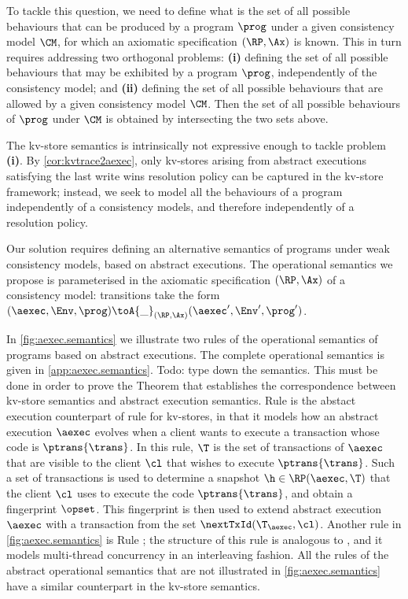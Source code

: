 To tackle this question, we need to define what is the set of all possible behaviours 
that can be produced by a program $\prog$ under a given consistency model $\CM$, for 
which an axiomatic specification $(\RP, \Ax)$ is known. This in turn requires addressing two orthogonal 
problems: \textbf{(i)} defining the set of all possible behaviours that may be exhibited by a program 
$\prog$, independently of the consistency model; and \textbf{(ii)} defining the set of all possible 
behaviours that are allowed by a given consistency model $\CM$. Then the set of all 
possible behaviours of $\prog$ under $\CM$ is obtained by intersecting the two sets 
above.

The kv-store semantics is intrinsically not expressive enough to tackle problem \textbf{(i)}. 
By \cref{cor:kvtrace2aexec}, only kv-stores arising 
from abstract executions satisfying the last write wins resolution policy can be captured in the kv-store 
framework; instead, we seek to model all the behaviours of a program independently of a consistency 
models, and therefore independently of a resolution policy. 

Our solution requires defining an alternative semantics of programs under weak consistency models, 
based on abstract executions. The operational semantics we propose is parameterised in 
the axiomatic specification $(\RP, \Ax)$ of a consistency model: transitions take the form 
$(\aexec, \Env, \prog) \toA{\_}_{(\RP, \Ax)} (\aexec', \Env', \prog')$. 

In \cref{fig:aexec.semantics} we illustrate two rules of the operational semantics of programs 
based on abstract executions. The complete operational semantics is given in \ref{app:aexec.semantics}. 
\ac{Todo: type down the semantics. This must be done in order to prove the Theorem that 
establishes the correspondence between kv-store semantics and abstract execution semantics.} 
Rule  is the abstact execution counterpart of rule  for kv-stores, in that 
it models how an abstract execution $\aexec$ evolves when a client wants to execute a transaction whose 
code is $\ptrans{\trans}$. In this rule, $\T$ is the set of transactions of $\aexec$ that are visible to the client 
$\cl$ that wishes to execute $\ptrans{\trans}$. Such a set of transactions is used to determine a snapshot 
$\h \in \RP(\aexec, \T)$ that the client $\cl$ uses to execute the code $\ptrans{\trans}$, and obtain a 
fingerprint $\opset$. This fingerprint is then used to extend abstract execution $\aexec$ with 
a transaction from the set $\nextTxId(\T_{\aexec}, \cl)$. Another rule in \cref{fig:aexec.semantics} 
is Rule ; the structure of this rule is analogous to , and it models 
multi-thread concurrency in an interleaving fashion. All the rules of the abstract operational semantics 
that are not illustrated in \cref{fig:aexec.semantics} have a similar counterpart in the kv-store semantics.

